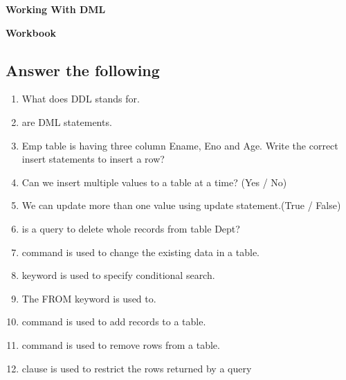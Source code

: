 \documentclass[11pt,a4paper]{article}
\begin{document}
\centerline{\huge{\textbf{Working With DML}}}
\vspace{1pc}
\centerline{\Large{ \textbf{Workbook}}}
\subsection*{Answer the following}
\begin{enumerate}\itemsep10pt
\item What does DDL stands for\underline{\hspace{3cm}}.
\item \underline{\hspace{3cm}} are DML statements.

\item Emp table is having three column Ename, Eno and Age. Write the correct insert statements to insert a row? \underline{\hspace{3cm}}

\item Can we insert multiple values to a table at a time? (Yes / No)

\item We can update more than one value using update statement.(True /
False)


\item \underline{\hspace{3cm}} is a query to delete whole records from table Dept?


\item \underline{\hspace{3cm}} command is used to change the existing data in a table.


\item \underline{\hspace{3cm}} keyword is used to specify conditional search.


\item The FROM keyword is used to\underline{\hspace{3cm}}.


\item \underline{\hspace{3cm}}command is used to add records to a table.

\item \underline{\hspace{3cm}}command is used to remove rows from a table.

\item \underline{\hspace{3cm}}clause is used to restrict the rows returned by a query

\end{enumerate}
\end{document}
